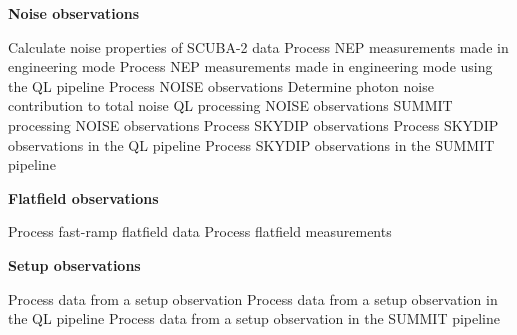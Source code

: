 \documentclass[twoside,11pt,nolof]{starlink}
\begin{document}
\begin{small}
{\large
\begin{center}
\textbf{Noise observations}
\end{center}
}
\begin{description}
Calculate noise properties of SCUBA-2 data
Process NEP measurements made in engineering mode
Process NEP measurements made in engineering mode using the QL pipeline
Process NOISE observations
Determine photon noise contribution to total noise
QL processing NOISE observations
SUMMIT processing NOISE observations
Process SKYDIP observations
Process SKYDIP observations in the QL pipeline
Process SKYDIP observations in the SUMMIT pipeline
\end{description}

{\large
\begin{center}
\textbf{Flatfield observations}
\end{center}
}
\begin{description}
Process fast-ramp flatfield data
Process flatfield measurements
\end{description}

{\large
\begin{center}
\textbf{Setup observations}
\end{center}
}
\begin{description}
Process data from a setup observation
Process data from a setup observation in the QL pipeline
Process data from a setup observation in the SUMMIT pipeline
\end{description}


\end{small}
\end{document}
